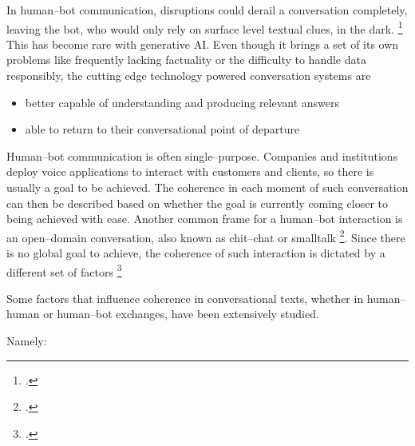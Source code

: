 \documentclass[12pt]{report}
\begin{document}
\par
In human–bot communication, disruptions could derail a conversation completely,
leaving the bot, who would only rely on surface level textual clues, in the dark. \footcite{mctear2020conversational}
This has become rare with generative AI.
Even though it brings a set of its own problems like
frequently lacking factuality or
the difficulty to handle data responsibly,
the cutting edge technology powered conversation systems are

\begin{itemize}
\item
   better capable of understanding and producing relevant answers

\item
   able to return to their conversational point of departure
\end{itemize}

\par
Human–bot communication is often single–purpose.
Companies and institutions deploy voice applications to interact with customers and clients,
so there is usually a goal to be achieved.
The coherence in each moment of such conversation can then be described based on whether
the goal is currently coming closer to being achieved with ease.
Another common frame for a human–bot interaction is an open–domain conversation,
also known as chit–chat or smalltalk \footcite{ramnauth2024chitchatdevelopingrobotssmalltalk}.
Since there is no global goal to achieve,
the coherence of such interaction is dictated by
a different set of factors \footcite{xu-etal-2021-discovering}

\par
Some factors that influence coherence in conversational texts,
whether in human–human or human–bot exchanges,
have been extensively studied.
\par
Namely:
\end{document}
